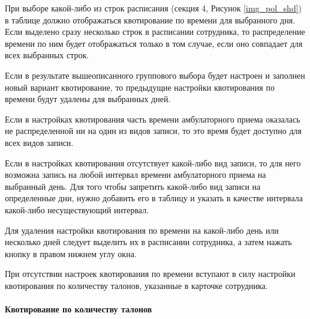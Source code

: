 При выборе какой-либо из строк расписания (секция 4, Рисунок \ref{img_pol_shd}) в таблице  должно отображаться квотирование по времени для выбранного дня. Если выделено сразу несколько строк в расписании сотрудника, то распределение времени по ним будет отображаться только в том случае, если оно совпадает для всех выбранных строк.

Если в результате вышеописанного группового выбора будет настроен и заполнен новый вариант квотирование, то предыдущие настройки квотирования по времени будут удалены для выбранных дней.

\begin{vnim}
Если в настройках квотирования часть времени амбулаторного приема оказалась не распределенной ни на один из видов записи, то это время будет доступно для всех видов записи.
\end{vnim}
 
\begin{prim}
 Если в настройках квотирования отсутствует какой-либо вид записи, то для него возможна запись на любой интервал времени амбулаторного приема на выбранный день. Для того чтобы запретить какой-либо вид записи на определенные дни, нужно добавить его в таблицу  и указать в качестве интервала какой-либо несуществующий интервал.
\end{prim}

Для удаления настройки квотирования по времени на какой-либо день или несколько дней следует выделить их в расписании сотрудника, а затем нажать кнопку   в правом нижнем углу окна.

\begin{vnim}
 При отсутствии настроек квотирования по времени вступают в силу настройки квотирования по количеству талонов, указанные в карточке сотрудника.
\end{vnim}

\paragraph{Квотирование по количеству талонов}

